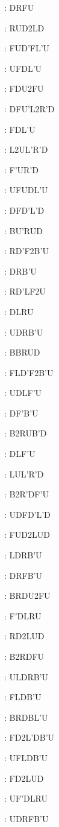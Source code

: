 \documentclass[9pt]{article}
\begin{document}
{\begin{multicols}{6}
: DRFU

: RUD2LD

: FUD'FL'U

: UFDL'U

: FDU2FU

: DFU'L2R'D

: FDL'U

: L2UL'R'D

: F'UR'D

: UFUDL'U

: DFD'L'D

: BU'RUD

: RD'F2B'U

: DRB'U

: RD'LF2U

: DLRU

: UDRB'U

: BBRUD

: FLD'F2B'U

: UDLF'U

: DF'B'U

: B2RUB'D

: DLF'U

: LUL'R'D

: B2R'DF'U

: UDFD'L'D

: FUD2LUD

: LDRB'U

: DRFB'U

: BRDU2FU

: F'DLRU

: RD2LUD

: B2RDFU

: ULDRB'U

: FLDB'U

: BRDBL'U

: FD2L'DB'U

: UFLDB'U

: FD2LUD

: UF'DLRU

: UDRFB'U


\end{multicols}}
\end{document}
